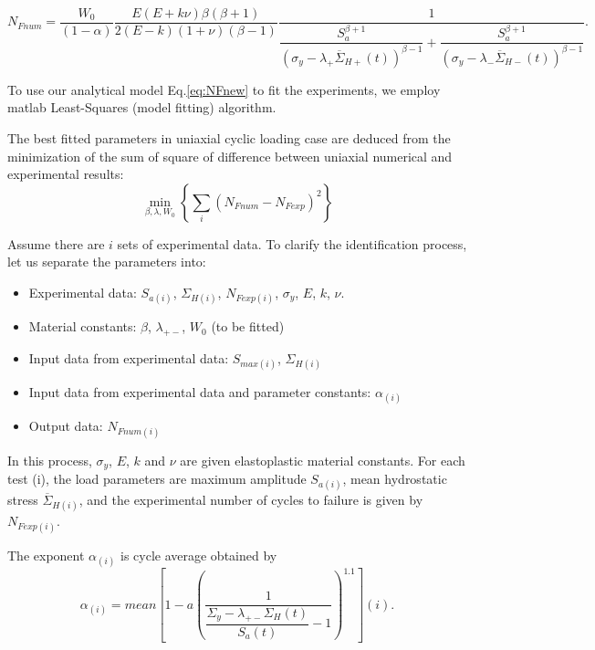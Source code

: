 \documentclass[3p,times,procedia,number]{elsarticle}
\begin{document}
\begin{equation}N_{Fnum}=\dfrac{W_0}{\left( 1-\alpha\right) }\dfrac{E(E+k\nu)\beta\left( \beta+1\right) }{ 2(E-k)(1+\nu)\left( \beta-1\right) }\dfrac{1}{\dfrac{S_{a}^{\beta+1}}{\left(\sigma_y-\lambda_+\overline{\Sigma}_{H+}(t)\right)^{\beta-1}}+\dfrac{S_{a}^{\beta+1}}{\left(\sigma_y-\lambda_-\overline{\Sigma}_{H-}(t)\right)^{\beta-1}}}.\label{eq:NFnew}
\end{equation}


To use our analytical model Eq.\eqref{eq:NFnew} to fit the experiments, we employ matlab Least-Squares (model fitting) algorithm. 

The best fitted parameters in uniaxial cyclic loading case are deduced from the minimization of the sum of square of difference between uniaxial numerical and experimental results:
\begin{equation}
\min_{\beta,\lambda,W_0}\left\lbrace \sum_{i}\left(N_{Fnum}-N_{Fexp} \right)^2\right\rbrace 
\label{eq.leastsquares}
\end{equation}

Assume there are $i$ sets of experimental data. To clarify the identification process, let us separate the parameters into:
\begin{itemize}
	\item Experimental data: $S_{a(i)}$, $\Sigma_{H(i)}$, $N_{Fexp(i)}$, $\sigma_y$, $E$, $k$, $\nu$.
	\item Material constants: $\beta$, $\lambda_{+-}$, $W_0$ (to be fitted)
	\item Input data from experimental data: $S_{max(i)}$, $\Sigma_{H(i)}$
	\item Input data from experimental data and parameter constants: $\alpha_{(i)}$
	\item Output data: $N_{Fnum(i)}$
\end{itemize}

In this process, $\sigma_y$, $E$, $k$ and $\nu$ are given elastoplastic material constants. For each test (i), the load parameters are maximum amplitude $S_{a(i)}$, mean hydrostatic stress $\overline{\Sigma}_{H(i)}$, and the experimental number of cycles to failure is given by $N_{Fexp(i)}$.

The exponent $\alpha_{(i)}$ is cycle average obtained by
\begin{equation}
\alpha_{(i)}=mean\left[1-a\left( \dfrac{1}{\dfrac{\Sigma_y-\lambda_{+-} \Sigma_{H}(t)}{S_{a}(t)}-1 } \right)^{1.1}\right] (i).
\label{eq.meanalp}
\end{equation}
\end{document}

